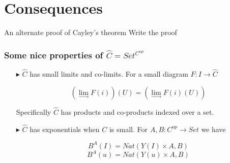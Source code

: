 \documentclass[10pt,compress]{beamer}
\begin{document}
\section{Consequences}

\begin{frame}

\begin{block}{An alternate proof of Cayley's theorem}
Write the proof
\end{block}	
	
\end{frame}


\begin{frame}
\frametitle{Some nice properties of $\widehat{C} = Set^{C^{op}}$}

\begin{enumerate}

\item[$\blacktriangleright$]
$\widehat{C}$ has small limits and co-limits. For a small diagram $F : I \to \widehat{C}$ 

\textcolor{beamer@mathtext}{
\[ (\lim_{\to} F(i))(U) = (\lim_{\to}F(i)(U)) \]
}


Specifically $\widehat{C}$ has products and co-products indexed over a set.

\item[$\blacktriangleright$]
$\widehat{C}$ has exponentials when $C$ is small. For $A, B : C^{op} \to Set$ we have

\textcolor{beamer@mathtext}{
\[ B^A(I) = Nat(Y(I) \times A, B) \]
\[ B^A(u) = Nat(Y(u) \times A, B) \]
}

\end{enumerate}




\end{frame}
\end{document}
